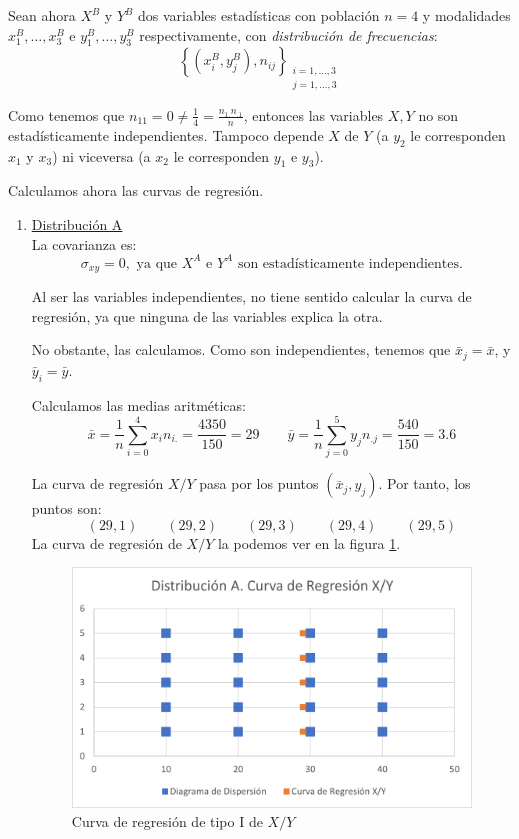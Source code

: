 \begin{ejercicio}
    Sean ahora $X^B$ y $Y^B$ dos variables estadísticas con población $n=4$ y modalidades $x_1^B, \dots, x_3^B$ e $y_1^B, \dots, y_3^B$ respectivamente, con \emph{distribución de frecuencias}:
        $$\left\{ (x_i^B,y_j^B), n_{ij}\right\}_{\substack{i=1,\dots,3\\j=1,\dots,3}}$$

    Como tenemos que $n_{11}=0\neq \frac{1}{4}=\frac{n_{1.}n_{.1}}{n}$, entonces las variables $X,Y$ no son estadísticamente independientes. Tampoco depende $X$ de $Y$ (a $y_2$ le corresponden $x_1$ y $x_3$) ni viceversa (a $x_2$ le corresponden $y_1$ e $y_3$).

    Calculamos ahora las curvas de regresión.
    \begin{enumerate}
        \item \underline{Distribución A}\\
        La covarianza es:
        \begin{equation*}
            \sigma_{xy} = 0,\text{ ya que $X^A$ e $Y^A$ son estadísticamente independientes.}
        \end{equation*}

        Al ser las variables independientes, no tiene sentido calcular la curva de regresión, ya que ninguna de las variables explica la otra.
        
        No obstante, las calculamos. Como son independientes, tenemos que $\bar{x}_j = \bar{x}$, y $\bar{y}_i = \bar{y}$.

        Calculamos las medias aritméticas:
        \begin{equation*}
            \bar{x}=\frac{1}{n} \sum_{i=0}^4 x_in_{i.} = \frac{4350}{150} = 29
            \qquad
            \bar{y}=\frac{1}{n} \sum_{j=0}^5 y_jn_{.j} = \frac{540}{150} = 3.6
        \end{equation*}

        La curva de regresión $X/Y$ pasa por los puntos $(\bar{x}_j, y_j)$. Por tanto, los puntos son:
        \begin{equation*}
            (29, 1) \qquad (29, 2) \qquad (29,3) \qquad (29, 4) \qquad (29, 5)
        \end{equation*}
        La curva de regresión de $X/Y$ la podemos ver en la figura \ref{fig:Ej5.A.1}.
        \begin{figure}[H]
            \centering
            \includegraphics[width=0.7\linewidth]{Imagenes/Ej5.A.1.png}
            \caption{Curva de regresión de tipo I de $X/Y$}
            \label{fig:Ej5.A.1}
        \end{figure}


\end{enumerate}
\end{ejercicio}
